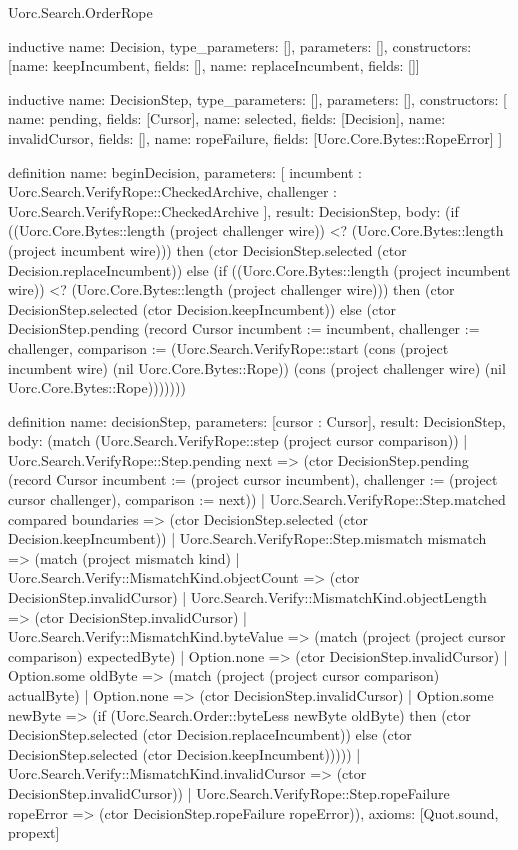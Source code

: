 \begin{lexlean}{Uorc.Search.OrderRope}
\begin{semanticmodule}
inductive{
  name: Decision,
  type_parameters: [],
  parameters: [],
  constructors: [{name: keepIncumbent, fields: []}, {name: replaceIncumbent, fields: []}]
}

inductive{
  name: DecisionStep,
  type_parameters: [],
  parameters: [],
  constructors: [
    {name: pending, fields: [Cursor]},
    {name: selected, fields: [Decision]},
    {name: invalidCursor, fields: []},
    {name: ropeFailure, fields: [Uorc.Core.Bytes::RopeError]}
  ]
}

definition{
  name: beginDecision,
  parameters: [
    incumbent : Uorc.Search.VerifyRope::CheckedArchive,
    challenger : Uorc.Search.VerifyRope::CheckedArchive
  ],
  result: DecisionStep,
  body: (if ((Uorc.Core.Bytes::length (project challenger wire)) <? (Uorc.Core.Bytes::length (project incumbent wire))) then (ctor DecisionStep.selected (ctor Decision.replaceIncumbent)) else (if ((Uorc.Core.Bytes::length (project incumbent wire)) <? (Uorc.Core.Bytes::length (project challenger wire))) then (ctor DecisionStep.selected (ctor Decision.keepIncumbent)) else (ctor DecisionStep.pending (record Cursor {incumbent := incumbent, challenger := challenger, comparison := (Uorc.Search.VerifyRope::start (cons (project incumbent wire) (nil Uorc.Core.Bytes::Rope)) (cons (project challenger wire) (nil Uorc.Core.Bytes::Rope)))}))))
}

definition{
  name: decisionStep,
  parameters: [cursor : Cursor],
  result: DecisionStep,
  body: (match (Uorc.Search.VerifyRope::step (project cursor comparison))
    | Uorc.Search.VerifyRope::Step.pending next => (ctor DecisionStep.pending (record Cursor {incumbent := (project cursor incumbent), challenger := (project cursor challenger), comparison := next}))
    | Uorc.Search.VerifyRope::Step.matched compared boundaries => (ctor DecisionStep.selected (ctor Decision.keepIncumbent))
    | Uorc.Search.VerifyRope::Step.mismatch mismatch => (match (project mismatch kind)
      | Uorc.Search.Verify::MismatchKind.objectCount => (ctor DecisionStep.invalidCursor)
      | Uorc.Search.Verify::MismatchKind.objectLength => (ctor DecisionStep.invalidCursor)
      | Uorc.Search.Verify::MismatchKind.byteValue => (match (project (project cursor comparison) expectedByte)
        | Option.none => (ctor DecisionStep.invalidCursor)
        | Option.some oldByte => (match (project (project cursor comparison) actualByte)
          | Option.none => (ctor DecisionStep.invalidCursor)
          | Option.some newByte => (if (Uorc.Search.Order::byteLess newByte oldByte) then (ctor DecisionStep.selected (ctor Decision.replaceIncumbent)) else (ctor DecisionStep.selected (ctor Decision.keepIncumbent)))))
      | Uorc.Search.Verify::MismatchKind.invalidCursor => (ctor DecisionStep.invalidCursor))
    | Uorc.Search.VerifyRope::Step.ropeFailure ropeError => (ctor DecisionStep.ropeFailure ropeError)),
  axioms: [Quot.sound, propext]
}


\end{semanticmodule}
\end{lexlean}
